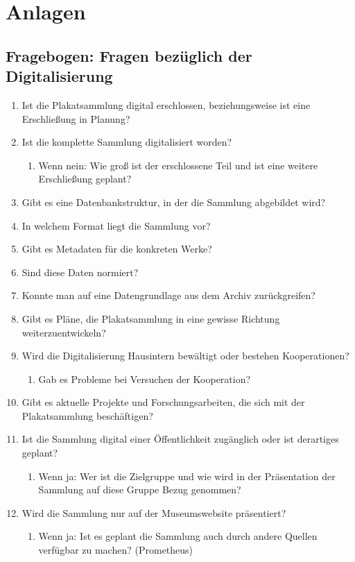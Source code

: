 \documentclass[a4paper,12pt,ngerman]{article}
\begin{document}
\newpage
\section{Anlagen}
\subsection{Fragebogen: Fragen bezüglich der Digitalisierung}
\begin{enumerate}
\item Ist die Plakatsammlung digital erschlossen, beziehungsweise ist eine Erschließung in Planung?
\item Ist die komplette Sammlung digitalisiert worden?
\begin{enumerate}
\item Wenn nein: Wie groß ist der erschlossene Teil und ist eine weitere Erschließung geplant?
\end{enumerate}
\item Gibt es eine Datenbankstruktur, in der die Sammlung abgebildet wird?
\item In welchem Format liegt die Sammlung vor?
\item Gibt es Metadaten für die konkreten Werke?
\item Sind diese Daten normiert?
\item Konnte man auf eine Datengrundlage aus dem Archiv zurückgreifen?
\item Gibt es Pläne, die Plakatsammlung in eine gewisse Richtung weiterzuentwickeln?
\item Wird die Digitalisierung Hausintern bewältigt oder bestehen Kooperationen?
\begin{enumerate}
\item Gab es Probleme bei Versuchen der Kooperation?
\end{enumerate}
\item Gibt es aktuelle Projekte und Forschungsarbeiten, die sich mit der Plakatsammlung beschäftigen?
\item Ist die Sammlung digital einer Öffentlichkeit zugänglich oder ist derartiges geplant?
\begin{enumerate}
\item Wenn ja: Wer ist die Zielgruppe und wie wird in der Präsentation der Sammlung auf diese Gruppe Bezug genommen?
\end{enumerate}
\item Wird die Sammlung nur auf der Museumswebsite präsentiert?
\begin{enumerate}
\item Wenn ja: Ist es geplant die Sammlung auch durch andere Quellen verfügbar zu machen? (Prometheus)

\end{enumerate}
\end{enumerate}
\end{document}
